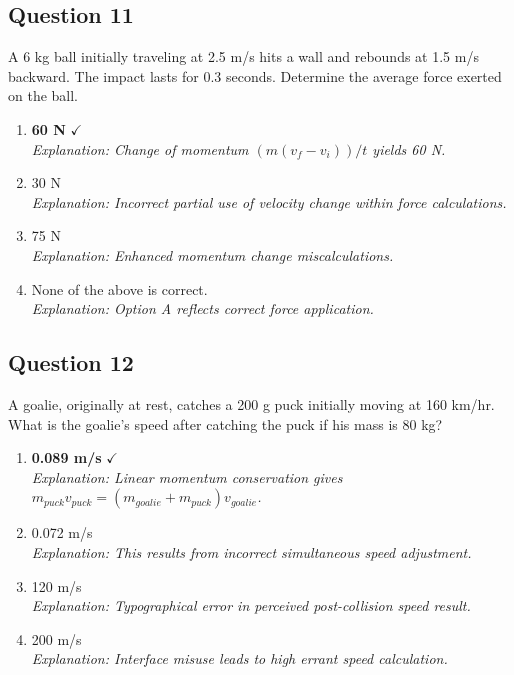 \documentclass[11pt]{article}
\newcommand{\QBlock}[3]{%
  \subsection*{Question #1}
  #2
  \begin{enumerate}[label=(\Alph*)]
  #3
  \end{enumerate}
  \vspace{1em}
}
\newcommand{\Correct}[2]{%
  \item \textbf{#1} \hfill $\checkmark$ \\
  \textit{Explanation: #2}
}
\newcommand{\Wrong}[2]{%
  \item #1 \\
  \textit{Explanation: #2}
}
\begin{document}
\QBlock{11}{A 6 kg ball initially traveling at 2.5 m/s hits a wall and rebounds at 1.5 m/s backward. The impact lasts for 0.3 seconds. Determine the average force exerted on the ball.}{
  \Correct{60 N}{Change of momentum $(m(v_f - v_i))/t$ yields 60 N.}
  \Wrong{30 N}{Incorrect partial use of velocity change within force calculations.}
  \Wrong{75 N}{Enhanced momentum change miscalculations.}
  \Wrong{None of the above is correct.}{Option A reflects correct force application.}
}

\QBlock{12}{A goalie, originally at rest, catches a 200 g puck initially moving at 160 km/hr. What is the goalie's speed after catching the puck if his mass is 80 kg?}{
  \Correct{0.089 m/s}{Linear momentum conservation gives $m_{puck}v_{puck} = (m_{goalie}+m_{puck})v_{goalie}$.}
  \Wrong{0.072 m/s}{This results from incorrect simultaneous speed adjustment.}
  \Wrong{120 m/s}{Typographical error in perceived post-collision speed result.}
  \Wrong{200 m/s}{Interface misuse leads to high errant speed calculation.}
}
\end{document}
